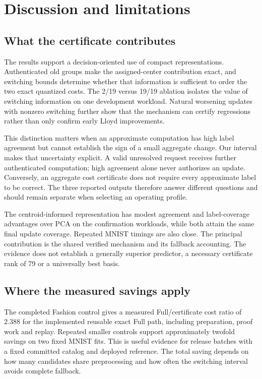 \section{Discussion and limitations}\label{sec:discussion}
\subsection{What the certificate contributes}
The results support a decision-oriented use of compact representations.
Authenticated old groups make the assigned-center contribution exact, and
switching bounds determine whether that information is sufficient to order
the two exact quantized costs. The 2/19 versus 19/19 ablation isolates the
value of switching information on one development workload. Natural
worsening updates with nonzero switching further show that the mechanism
can certify regressions rather than only confirm early Lloyd improvements.

This distinction matters when an approximate computation has high label
agreement but cannot establish the sign of a small aggregate change. Our
interval makes that uncertainty explicit. A valid unresolved request
receives further authenticated computation; high agreement alone never
authorizes an update. Conversely, an aggregate cost certificate does not
require every approximate label to be correct. The three reported outputs
therefore answer different questions and should remain separate when
selecting an operating profile.

The centroid-informed representation has modest agreement and label-coverage
advantages over PCA on the confirmation workloads, while both attain the
same final update coverage. Repeated MNIST timings are also close. The
principal contribution is the shared verified mechanism and its fallback
accounting. The evidence does not establish a generally superior predictor,
a necessary certificate rank of 79 or a universally best basis.

\subsection{Where the measured savings apply}
The completed Fashion control gives a measured Full/certificate cost ratio
of 2.388 for the implemented reusable exact Full path, including
preparation, proof work and replay. Repeated smaller controls support approximately twofold
savings on two fixed MNIST fits. This is useful evidence for release batches
with a fixed committed catalog and deployed reference. The total saving
depends on how many candidates share preprocessing and how often the
switching interval avoids complete fallback.

